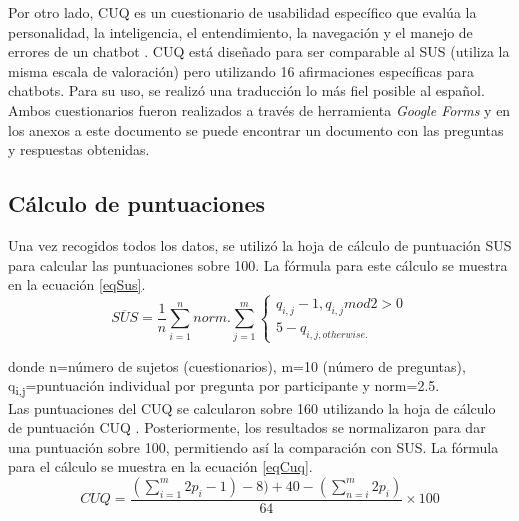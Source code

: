 Por otro lado, CUQ es un cuestionario de usabilidad específico que evalúa la personalidad, la inteligencia, el entendimiento, la navegación y el manejo de errores de un chatbot \cite{cuq}. CUQ está diseñado para ser comparable al SUS (utiliza la misma escala de valoración) pero utilizando 16 afirmaciones específicas para chatbots. Para su uso, se realizó una traducción lo más fiel posible al español.\\

Ambos cuestionarios fueron realizados a través de herramienta \textit{Google Forms} y en los anexos a este documento se puede encontrar un documento con las preguntas y respuestas obtenidas.

\subsection{Cálculo de puntuaciones}
Una vez recogidos todos los datos, se utilizó la hoja de cálculo de puntuación SUS \cite{susSpread} para calcular las puntuaciones sobre 100. La fórmula para este cálculo se muestra en la ecuación \ref{eqSus}.\\

\begin{equation}
\overline{SUS} = \frac{1}{n} \sum_{i=1}^{n}norm. \sum_{j=1}^{m} \left\{
    \begin{array}{ll}
        q_{i,j}-1,q_{i,j} mod2>0 \\
        5-q_{i,j,otherwise.}
    \end{array}
\right.
\label{eqSus}
\end{equation}

donde n=número de sujetos (cuestionarios), m=10 (número de preguntas), q\textsubscript{i,j}=puntuación individual por pregunta por participante y norm=2.5.\\

Las puntuaciones del CUQ se calcularon sobre 160 utilizando la hoja de cálculo de puntuación CUQ \cite{cuqCalc}. Posteriormente, los resultados se normalizaron para dar una puntuación sobre 100, permitiendo así la comparación con SUS. La fórmula para el cálculo se muestra en la ecuación \ref{eqCuq}.\\


\begin{equation}
CUQ = \frac{(\sum_{i=1}^{m}2p_{i}-1)-8)+40-(\sum_{n=i}^{m}2p_{i})}{64} \times 100
\label{eqCuq}
\end{equation}


